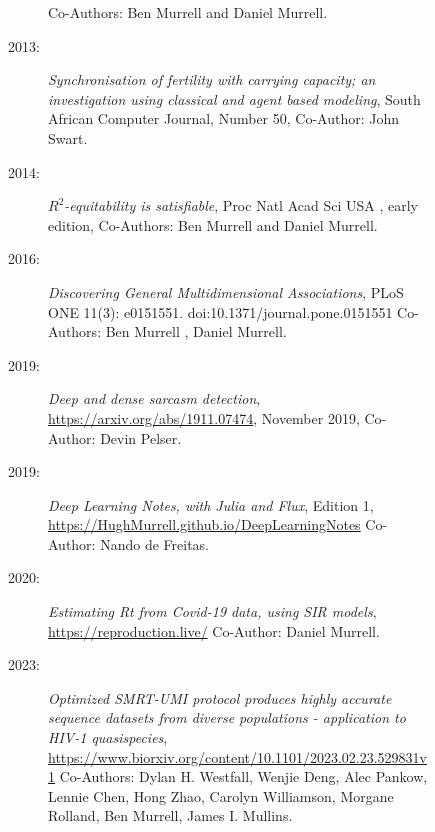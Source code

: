 \begin{description}
\begin{description}
\begin{description}
       Co-Authors: Ben Murrell and Daniel Murrell.\newline
\item[2013:]
       {\it Synchronisation of fertility with carrying capacity; 
       an investigation using classical and agent based modeling},
       South African Computer Journal, Number 50,
       Co-Author: John Swart. \newline
\item[2014:]
         {\it $R^2$-equitability is satisfiable}, Proc Natl Acad Sci USA , early edition, 
         Co-Authors: Ben Murrell and Daniel Murrell. \newline
\item[2016:]
         {\it Discovering General Multidimensional Associations},
         PLoS ONE 11(3): e0151551. doi:10.1371/journal.pone.0151551
	Co-Authors: Ben Murrell , Daniel Murrell. \newline
\item[2019:]
         {\it Deep and dense sarcasm detection},
         \url{https://arxiv.org/abs/1911.07474}, November 2019,
         Co-Author: Devin Pelser. \newline
 \item[2019:]
 	{\it Deep Learning Notes, with Julia and Flux}, Edition 1,
	\url{https://HughMurrell.github.io/DeepLearningNotes}
	Co-Author: Nando de Freitas. \newline \newline
\item[2020:]
	{\it Estimating Rt from Covid-19 data, using SIR models},
	\url{https://reproduction.live/}
	Co-Author: Daniel Murrell. \newline
\item[2023:]
         {\it Optimized SMRT-UMI protocol produces highly accurate 
         sequence datasets from diverse populations - application to HIV-1 quasispecies},
         \url{https://www.biorxiv.org/content/10.1101/2023.02.23.529831v1}
         Co-Authors: Dylan H. Westfall, Wenjie Deng, Alec Pankow, 
         Lennie Chen, Hong Zhao, Carolyn Williamson, Morgane Rolland, 
         Ben Murrell, James I. Mullins.

\end{description}
\end{description}
\end{description}
\label{f0}
